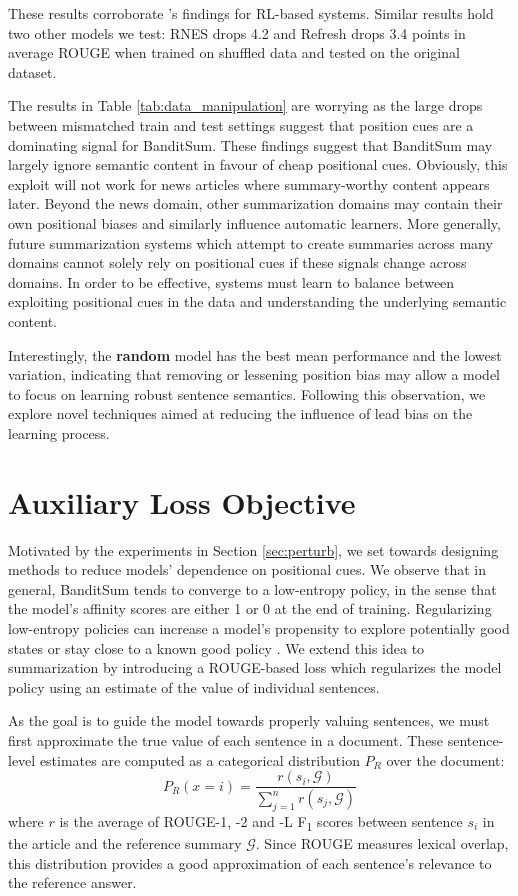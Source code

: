These results corroborate \cite{kedzie2018content}'s findings for RL-based systems. Similar results hold two other models we test: RNES \parencite{DBLP:conf/aaai/WuH18} drops 4.2 and Refresh \parencite{DBLP:Narayan/2018} drops 3.4 points in average ROUGE when trained on shuffled data and tested on the original dataset.

The results in Table \ref{tab:data_manipulation} are worrying as the large drops between mismatched train and test settings suggest that position cues are a dominating signal for BanditSum. These findings suggest that BanditSum may largely ignore semantic content in favour of cheap positional cues. Obviously, this exploit will not work for news articles where summary-worthy content appears later. Beyond the news domain, other summarization domains may contain their own positional biases and similarly influence automatic learners. More generally, future summarization systems which attempt to create summaries across many domains cannot solely rely on positional cues if these signals change across domains. In order to be effective, systems must learn to balance between exploiting positional cues in the data and understanding the underlying semantic content.

Interestingly, the \textbf{random} model has the 
best mean performance and the lowest variation, indicating that removing or lessening position bias may allow a model to focus on learning robust sentence semantics. Following this observation, we explore novel techniques aimed at reducing the influence of lead bias on the learning process.

\section{Auxiliary Loss Objective}
Motivated by the experiments in Section \ref{sec:perturb}, we set towards designing methods to reduce models' dependence on positional cues. We observe that in general, BanditSum tends to converge to a low-entropy policy, in the sense that the model's affinity scores are either 1 or 0 at the end of training. Regularizing low-entropy policies can increase a model's propensity to explore potentially good states or stay close to a known good policy \parencite{nachum2017improving, galashov2019information}. We extend this idea to summarization by introducing a ROUGE-based loss which regularizes the model policy using an estimate of the value of individual sentences.

As the goal is to guide the model towards properly valuing sentences, we must first approximate the true value of each sentence in a document. These sentence-level estimates are computed as a categorical distribution $P_R$ over the document:
\begin{equation}
    P_R( x = i ) = \frac{r(s_i, \mathcal{G})}{\sum_{j=1}^{n}{r(s_j, \mathcal{G})}}
\end{equation}
where $r$ is the average of ROUGE-1, -2 and -L F\textsubscript{1} scores between sentence $s_i$ in the article and the reference summary $\mathcal{G}$. Since ROUGE measures lexical overlap, this distribution provides a good approximation of each sentence's relevance to the reference answer.

